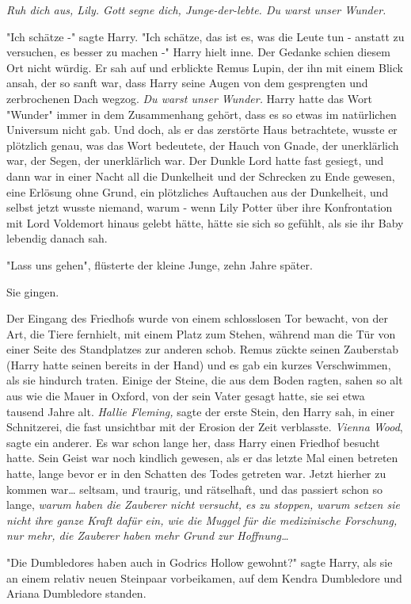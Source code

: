 {\emph{Ruh dich aus, Lily. Gott segne dich, Junge-der-lebte. Du warst unser Wunder.}

"Ich schätze -" sagte Harry. "Ich schätze, das ist es, was die Leute tun - anstatt zu versuchen, es besser zu machen -" Harry hielt inne. Der Gedanke schien diesem Ort nicht würdig. Er sah auf und erblickte Remus Lupin, der ihn mit einem Blick ansah, der so sanft war, dass Harry seine Augen von dem gesprengten und zerbrochenen Dach wegzog. \emph{Du warst unser Wunder.} Harry hatte das Wort "Wunder" immer in dem Zusammenhang gehört, dass es so etwas im natürlichen Universum nicht gab. Und doch, als er das zerstörte Haus betrachtete, wusste er plötzlich genau, was das Wort bedeutete, der Hauch von Gnade, der unerklärlich war, der Segen, der unerklärlich war. Der Dunkle Lord hatte fast gesiegt, und dann war in einer Nacht all die Dunkelheit und der Schrecken zu Ende gewesen, eine Erlösung ohne Grund, ein plötzliches Auftauchen aus der Dunkelheit, und selbst jetzt wusste niemand, warum - wenn Lily Potter über ihre Konfrontation mit Lord Voldemort hinaus gelebt hätte, hätte sie sich so gefühlt, als sie ihr Baby lebendig danach sah.

"Lass uns gehen", flüsterte der kleine Junge, zehn Jahre später.

Sie gingen.

Der Eingang des Friedhofs wurde von einem schlosslosen Tor bewacht, von der Art, die Tiere fernhielt, mit einem Platz zum Stehen, während man die Tür von einer Seite des Standplatzes zur anderen schob. Remus zückte seinen Zauberstab (Harry hatte seinen bereits in der Hand) und es gab ein kurzes Verschwimmen, als sie hindurch traten. Einige der Steine, die aus dem Boden ragten, sahen so alt aus wie die Mauer in Oxford, von der sein Vater gesagt hatte, sie sei etwa tausend Jahre alt. \emph{Hallie Fleming,} sagte der erste Stein, den Harry sah, in einer Schnitzerei, die fast unsichtbar mit der Erosion der Zeit verblasste. \emph{Vienna Wood}, sagte ein anderer. Es war schon lange her, dass Harry einen Friedhof besucht hatte. Sein Geist war noch kindlich gewesen, als er das letzte Mal einen betreten hatte, lange bevor er in den Schatten des Todes getreten war. Jetzt hierher zu kommen war… seltsam, und traurig, und rätselhaft, und das passiert schon so lange, \emph{warum haben die Zauberer nicht versucht, es zu stoppen, warum setzen sie nicht ihre ganze Kraft dafür ein, wie die Muggel für die medizinische Forschung, nur mehr, die Zauberer haben mehr Grund zur Hoffnung…}

"Die Dumbledores haben auch in Godrics Hollow gewohnt?" sagte Harry, als sie an einem relativ neuen Steinpaar vorbeikamen, auf dem Kendra Dumbledore und Ariana Dumbledore standen.

}
